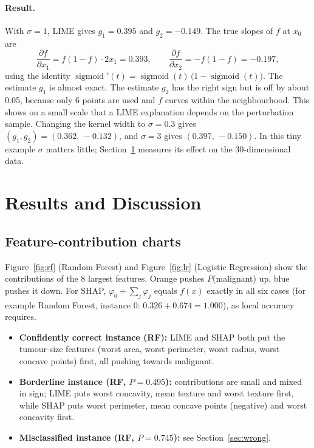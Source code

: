 \documentclass[11pt,a4paper]{article}
\begin{document}
\paragraph{Result.} With $\sigma = 1$, LIME gives $g_1 = 0.395$ and
$g_2 = -0.149$. The true slopes of $f$ at $x_0$ are
\begin{equation}
\frac{\partial f}{\partial x_1} = f(1-f)\cdot 2x_1 = 0.393, \qquad
\frac{\partial f}{\partial x_2} = -f(1-f) = -0.197,
\end{equation}
using the identity $\operatorname{sigmoid}'(t) = \operatorname{sigmoid}(t)\,\big(1 - \operatorname{sigmoid}(t)\big)$.
The estimate $g_1$ is almost exact. The estimate $g_2$ has the right sign but is
off by about 0.05, because only 6 points are used and $f$ curves within the
neighbourhood. This shows on a small scale that a LIME explanation depends on
the perturbation sample. Changing the kernel width to $\sigma = 0.3$ gives
$(g_1, g_2) = (0.362,\, -0.132)$, and $\sigma = 3$ gives $(0.397,\, -0.150)$.
In this tiny example $\sigma$ matters little; Section~\ref{sec:results}
measures its effect on the 30-dimensional data.

\section{Results and Discussion}\label{sec:results}

\subsection{Feature-contribution charts}
\label{sec:charts}
Figure~\ref{fig:rf} (Random Forest) and Figure~\ref{fig:lr} (Logistic Regression) show the contributions of the 8 largest features. Orange pushes $P$(malignant) up, blue pushes it down. For SHAP, $\varphi_0 + \sum_j \varphi_j$ equals $f(x)$ exactly in all six cases (for example Random Forest, instance 0: $0.326 + 0.674 = 1.000$), as local accuracy requires.
\begin{itemize}
  \item \textbf{Confidently correct instance (RF):} LIME and SHAP both put the tumour-size features (worst area, worst perimeter, worst radius, worst concave points) first, all pushing towards malignant.
  \item \textbf{Borderline instance (RF, $P = 0.495$):} contributions are small and mixed in sign; LIME puts worst concavity, mean texture and worst texture first, while SHAP puts worst perimeter, mean concave points (negative) and worst concavity first.
  \item \textbf{Misclassified instance (RF, $P = 0.745$):} see Section~\ref{sec:wrong}.
\end{itemize}
\end{document}
